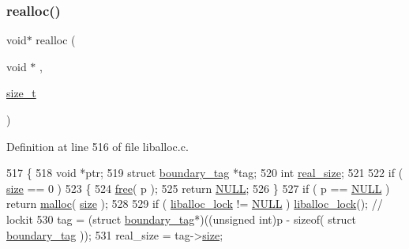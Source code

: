 \subsubsection{\texorpdfstring{realloc()}{realloc()}}
{\footnotesize\ttfamily void$\ast$ realloc (\begin{DoxyParamCaption}\item[{void $\ast$}]{,  }\item[{\hyperlink{a00026_a7c94ea6f8948649f8d181ae55911eeaf_a7c94ea6f8948649f8d181ae55911eeaf}{size\+\_\+t}}]{ }\end{DoxyParamCaption})}



Definition at line 516 of file liballoc.\+c.


\begin{DoxyCode}
517 \{
518     \textcolor{keywordtype}{void} *ptr;
519     \textcolor{keyword}{struct }\hyperlink{a00095}{boundary\_tag} *tag;
520     \textcolor{keywordtype}{int} \hyperlink{a00095_ad22b1c69bdce419783ac165f7f354245_ad22b1c69bdce419783ac165f7f354245}{real\_size};
521     
522     \textcolor{keywordflow}{if} ( \hyperlink{a00095_a29b056a39f6022d32468e7913e6df936_a29b056a39f6022d32468e7913e6df936}{size} == 0 )
523     \{
524         \hyperlink{a00023_afbedc913aa4651b3c3b4b3aecd9b4711_afbedc913aa4651b3c3b4b3aecd9b4711}{free}( p );
525         \textcolor{keywordflow}{return} \hyperlink{a00026_a070d2ce7b6bb7e5c05602aa8c308d0c4_a070d2ce7b6bb7e5c05602aa8c308d0c4}{NULL};
526     \}
527     \textcolor{keywordflow}{if} ( p == \hyperlink{a00026_a070d2ce7b6bb7e5c05602aa8c308d0c4_a070d2ce7b6bb7e5c05602aa8c308d0c4}{NULL} ) \textcolor{keywordflow}{return} \hyperlink{a00023_a7ac38fce3243a7dcf448301ee9ffd392_a7ac38fce3243a7dcf448301ee9ffd392}{malloc}( \hyperlink{a00095_a29b056a39f6022d32468e7913e6df936_a29b056a39f6022d32468e7913e6df936}{size} );
528 
529     \textcolor{keywordflow}{if} ( \hyperlink{a00026_a8b5670e4594b0b6f8be78fe17f0c3b53_a8b5670e4594b0b6f8be78fe17f0c3b53}{liballoc\_lock} != \hyperlink{a00026_a070d2ce7b6bb7e5c05602aa8c308d0c4_a070d2ce7b6bb7e5c05602aa8c308d0c4}{NULL} ) \hyperlink{a00026_a8b5670e4594b0b6f8be78fe17f0c3b53_a8b5670e4594b0b6f8be78fe17f0c3b53}{liballoc\_lock}();     \textcolor{comment}{// lockit}
530         tag = (\textcolor{keyword}{struct }\hyperlink{a00095}{boundary\_tag}*)((\textcolor{keywordtype}{unsigned} \textcolor{keywordtype}{int})p - \textcolor{keyword}{sizeof}( \textcolor{keyword}{struct }
      \hyperlink{a00095}{boundary\_tag} ));
531         real\_size = tag->\hyperlink{a00095_a29b056a39f6022d32468e7913e6df936_a29b056a39f6022d32468e7913e6df936}{size};

\end{DoxyCode}

